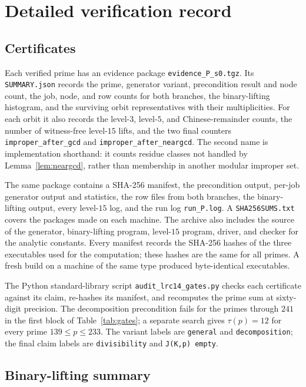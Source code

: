 \documentclass[11pt]{article}
\theoremstyle{definition}
\theoremstyle{remark}
\begin{document}
\section{Detailed verification record}\label{sec:audit}\label{app:audit}

\subsection{Certificates}
Each verified prime has an evidence package \texttt{evidence\_P\_s0.tgz}.
Its \texttt{SUMMARY.json} records the prime, generator variant,
precondition result and node count, the job, node, and row counts for both
branches, the binary-lifting histogram, and the surviving orbit
representatives with their multiplicities.  For each orbit it also records
the level-$3$, level-$5$, and Chinese-remainder counts, the number of
witness-free level-$15$ lifts, and the two final counters
\texttt{improper\_after\_gcd} and
\texttt{improper\_after\_neargcd}.  The second name is implementation
shorthand: it counts residue classes not handled by
Lemma~\ref{lem:neargcd}, rather than membership in another modular
improper set.

The same package contains a SHA-256 manifest, the precondition output,
per-job generator output and statistics, the row files from both branches,
the binary-lifting output, every level-$15$ log, and the run log
\texttt{run\_P.log}.  A \texttt{SHA256SUMS.txt} covers the packages made on
each machine.  The archive also includes the source of the generator,
binary-lifting program, level-$15$ program, driver, and checker for the
analytic constants.  Every manifest records the SHA-256 hashes of the
three executables used for the computation; these hashes are the same for
all \GateCount{} primes.  A fresh build on a machine of the same type
produced byte-identical executables.

The Python standard-library script \texttt{audit\_lrc14\_gates.py} checks
each certificate against its claim, re-hashes its manifest, and recomputes
the prime sum at sixty-digit precision.  The decomposition precondition
fails for the \NearGcdCount{} primes through $241$ in the first block of
Table~\ref{tab:gates}; a separate search gives $\tau(p)=12$ for every
prime $139\leq p\leq233$.  The variant labels are \texttt{general} and
\texttt{decomposition}; the final claim labels are \texttt{divisibility}
and \texttt{J(K,p) empty}.

\subsection{Binary-lifting summary}
\end{document}
